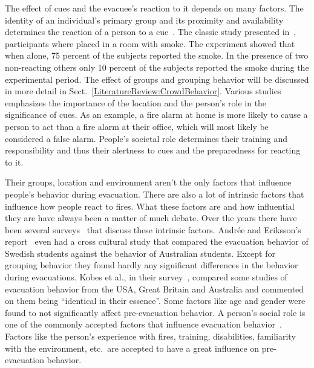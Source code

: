 The effect of cues and the evacuee's reaction to it depends on many factors. The identity of an individual's primary group and its proximity and availability determines the reaction of a person to a cue~\cite{Sime:1983uy}. The classic study presented in~\cite{Latane:1969wm}, participants where placed in a room with smoke. The experiment showed that when alone, 75 percent of the subjects reported the smoke. In the presence of two non-reacting others only 10 percent of the subjects reported the smoke during the experimental period. The effect of groups and grouping behavior will be discussed in more detail in Sect.~\ref{LiteratureReview:CrowdBehavior}. Various studies~\cite{Proulx:2003tc,Proulx:2001we,Paulsen:1984ti,Sandberg:1997tw,Cocking:2008vv,Tong:1985wn} emphasizes the importance of the location and the person's role in the significance of cues. As an example, a fire alarm at home is more likely to cause a person to act than a fire alarm at their office, which will most likely be considered a false alarm. People's societal role determines their training and responsibility and thus their alertness to cues and the preparedness for reacting to it.

Their groups, location and environment aren't the only factors that influence people's behavior during evacuation. There are also a lot of intrinsic factors that influence how people react to fires. What these factors are and how influential they are have always been a matter of much debate. Over the years there have been several surveys~\cite{Tong:1985wn,Sandberg:1997tw,Kuligowski:2009un} that discuss these intrinsic factors. Andr\'{e}e and Eriksson's report~\cite{Andree:2008td} even had a cross cultural study that compared the evacuation behavior of Swedish students against the behavior of Australian students. Except for grouping behavior they found hardly any significant differences in the behavior during evacuations. Kobes et al., in their survey~\cite{Kobes:2009jx}, compared some studies of evacuation behavior from the USA, Great Britain and Australia and commented on them being ``identical in their essence''. Some factors like age and gender were found to not significantly affect pre-evacuation behavior. A person's social role is one of the commonly accepted factors that influence evacuation behavior~\cite{Sandberg:1997tw,Kobes:2009jx,Paulsen:1984ti}. Factors like the person's experience with fires, training, disabilities, familiarity with the environment, etc.\ are accepted to have a great influence on pre-evacuation behavior.

